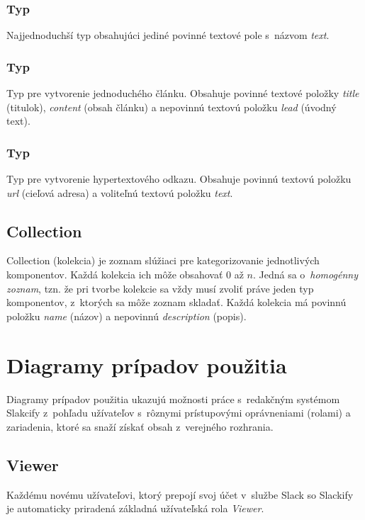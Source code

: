 \subsubsection{Typ }
Najjednoduchší typ obsahujúci jediné povinné textové pole s~názvom \emph{text}.

\subsubsection{Typ }
Typ pre vytvorenie jednoduchého článku. Obsahuje povinné textové položky \emph{title} (titulok), \emph{content} (obsah článku) a nepovinnú textovú položku \emph{lead} (úvodný text).

\subsubsection{Typ }
Typ pre vytvorenie hypertextového odkazu. Obsahuje povinnú textovú položku \emph{url} (cieľová adresa) a voliteľnú textovú položku \emph{text}.

\subsection{Collection}
\label{design:collection}
Collection (kolekcia) je zoznam slúžiaci pre kategorizovanie jednotlivých komponentov. Každá kolekcia ich môže obsahovať 0 až $n$. Jedná sa o~\emph{homogénny zoznam}, tzn. že pri tvorbe kolekcie sa vždy musí zvoliť práve jeden typ komponentov, z~ktorých sa môže zoznam skladať. Každá kolekcia má povinnú položku \emph{name} (názov) a nepovinnú \emph{description} (popis).

\section{Diagramy prípadov použitia}
\label{design:use_case}
Diagramy prípadov použitia ukazujú možnosti práce s~redakčným systémom Slakcify z~pohľadu užívateľov s~rôznymi prístupovými oprávneniami (rolami) a zariadenia, ktoré sa snaží získať obsah z~verejného rozhrania.

\subsection{Viewer}
Každému novému užívateľovi, ktorý prepojí svoj účet v~službe Slack so Slackify je automaticky priradená základná užívateľská rola \emph{Viewer}. \\

